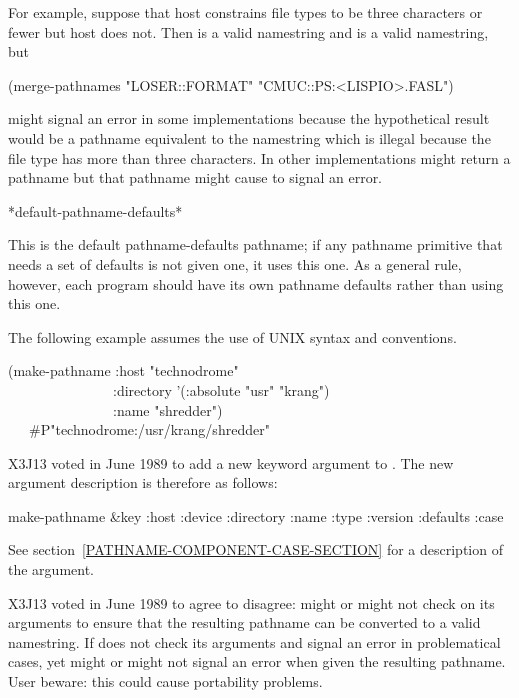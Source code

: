 \begin{defun}[Function]
\begin{newer}
For example, suppose that host  constrains file types to be three characters
or fewer but host  does not.  Then  is a valid
namestring and  is a valid namestring, but
\begin{lisp}
(merge-pathnames "LOSER::FORMAT" "CMUC::PS:<LISPIO>.FASL")
\end{lisp}
might signal an error in some implementations because the hypothetical result would be a pathname
equivalent to the namestring  which is illegal
because the file type  has more than three characters.
In other implementations  might return a pathname but that pathname might
cause  to signal an error.
\end{newer}
\end{defun}

\begin{defun}[Variable]
*default-pathname-defaults*

This is the default pathname-defaults pathname; if any pathname primitive
that needs a set of defaults is not given one, it uses this one.
As a general rule, however, each program
should have its own pathname defaults rather than using this one.
\end{defun}

The following example assumes the use of UNIX syntax and conventions.
\begin{lisp}
(make-pathname :host "technodrome" \\
~~~~~~~~~~~~~~~:directory '(:absolute "usr" "krang") \\
~~~~~~~~~~~~~~~:name "shredder") \\
~~\EV\ \#P"technodrome:/usr/krang/shredder"
\end{lisp}
X3J13 voted in June 1989  to add a new keyword
argument  to .  The new argument description
is therefore as follows:

\begin{defun}[Function]
make-pathname &key :host :device :directory :name :type :version :defaults :case

See section~\ref{PATHNAME-COMPONENT-CASE-SECTION} for a description
of the  argument.

X3J13 voted in June 1989  to agree to disagree:
 might or might not check
on its arguments to ensure that the resulting pathname can be converted to
a valid namestring.  If  does not check its arguments
and signal an error in problematical cases,
 yet might or might not signal an error when given the resulting
pathname.  User beware: this could cause portability problems.
\end{defun}

